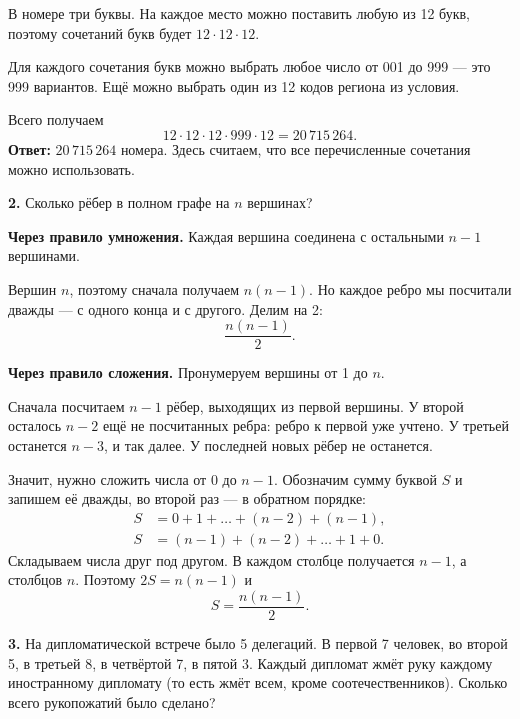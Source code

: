 \begin{solution}\label{solution-combinatorics-rules-problems-1}
В номере три буквы. На каждое место можно поставить любую из 12 букв, поэтому сочетаний букв будет $12\cdot12\cdot12$.

Для каждого сочетания букв можно выбрать любое число от 001 до 999 — это 999 вариантов. Ещё можно выбрать один из 12 кодов региона из условия.

Всего получаем
\[
12\cdot12\cdot12\cdot999\cdot12=20\,715\,264.
\]
\textbf{Ответ:} $20\,715\,264$ номера. Здесь считаем, что все перечисленные сочетания можно использовать.
\end{solution}

\begin{task}\label{task-problems-2}
\textbf{2.} Сколько рёбер в полном графе на \(n\) вершинах?
\end{task}

\begin{solution}\label{solution-combinatorics-rules-problems-2}
\textbf{Через правило умножения.} Каждая вершина соединена с остальными $n-1$ вершинами.

Вершин $n$, поэтому сначала получаем $n(n-1)$. Но каждое ребро мы посчитали дважды — с одного конца и с другого. Делим на 2:
\[
\frac{n(n-1)}{2}.
\]
\end{solution}

\begin{solution}\label{solution-combinatorics-rules-problems-2-addition}
\textbf{Через правило сложения.} Пронумеруем вершины от 1 до $n$.

Сначала посчитаем $n-1$ рёбер, выходящих из первой вершины. У второй осталось $n-2$ ещё не посчитанных ребра: ребро к первой уже учтено. У третьей останется $n-3$, и так далее. У последней новых рёбер не останется.

Значит, нужно сложить числа от 0 до $n-1$. Обозначим сумму буквой $S$ и запишем её дважды, во второй раз — в обратном порядке:
\[
\begin{aligned}
S&=0+1+\dots+(n-2)+(n-1),\\
S&=(n-1)+(n-2)+\dots+1+0.
\end{aligned}
\]
Складываем числа друг под другом. В каждом столбце получается $n-1$, а столбцов $n$. Поэтому $2S=n(n-1)$ и
\[
S=\frac{n(n-1)}{2}.
\]
\end{solution}

\begin{task}\label{task-problems-3}
\textbf{3.} На дипломатической встрече было 5 делегаций. В первой 7 человек, во второй 5, в третьей 8, в четвёртой 7, в пятой 3. Каждый дипломат жмёт руку каждому иностранному дипломату (то есть жмёт всем, кроме соотечественников). Сколько всего рукопожатий было сделано?
\end{task}

